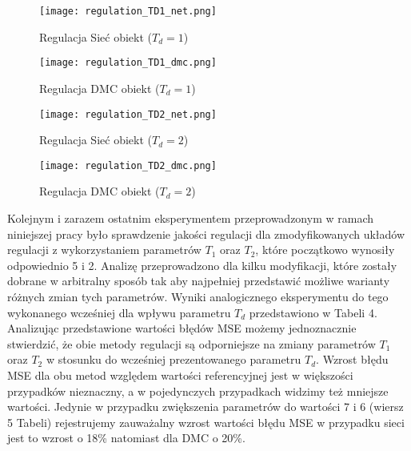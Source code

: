 \begin{figure}[!h]
\centering
\begin{minipage}{.5\textwidth}
  \label{fig:Regulation-TD1-net}
  \centering \texttt{[image: regulation\_TD1\_net.png]}
  \caption{Regulacja Sieć obiekt (\(T_d=1\))}
  \label{fig:test1}
\end{minipage}%
\begin{minipage}{.5\textwidth}
  \label{fig:Regulation-TD1-dmc}
  \centering \texttt{[image: regulation\_TD1\_dmc.png]}
  \caption{Regulacja DMC obiekt (\(T_d=1\))}
\end{minipage}
\end{figure}

\begin{figure}[!h]
\centering
\begin{minipage}{.5\textwidth}
  \label{fig:Regulation-TD2-net}
  \centering \texttt{[image: regulation\_TD2\_net.png]}
  \caption{Regulacja Sieć obiekt (\(T_d=2\))}
  \label{fig:test1}
\end{minipage}%
\begin{minipage}{.5\textwidth}
  \label{fig:Regulation-TD2-dmc}
  \centering \texttt{[image: regulation\_TD2\_dmc.png]}
  \caption{Regulacja DMC obiekt (\(T_d=2\))}
\end{minipage}
\end{figure}

\par Kolejnym i zarazem ostatnim eksperymentem przeprowadzonym w ramach niniejszej pracy było sprawdzenie jakości regulacji dla zmodyfikowanych układów regulacji z wykorzystaniem parametrów \(T_1\) oraz \(T_2\), które początkowo wynosiły odpowiednio 5 i 2. Analizę przeprowadzono dla kilku modyfikacji, które zostały dobrane w arbitralny sposób tak aby najpełniej przedstawić możliwe warianty różnych zmian tych parametrów. Wyniki analogicznego eksperymentu do tego wykonanego wcześniej dla wpływu parametru \(T_d\) przedstawiono w Tabeli 4. Analizując przedstawione wartości błędów MSE możemy jednoznacznie stwierdzić, że obie metody regulacji są odporniejsze na zmiany parametrów \(T_1\) oraz \(T_2\) w stosunku do wcześniej prezentowanego parametru \(T_d\). Wzrost błędu MSE dla obu metod względem wartości referencyjnej jest w większości przypadków nieznaczny, a w pojedynczych przypadkach widzimy też mniejsze wartości. Jedynie w przypadku zwiększenia parametrów do wartości 7 i 6 (wiersz 5 Tabeli) rejestrujemy zauważalny wzrost wartości błędu MSE w przypadku sieci jest to wzrost o 18\% natomiast dla DMC o 20\%.     

